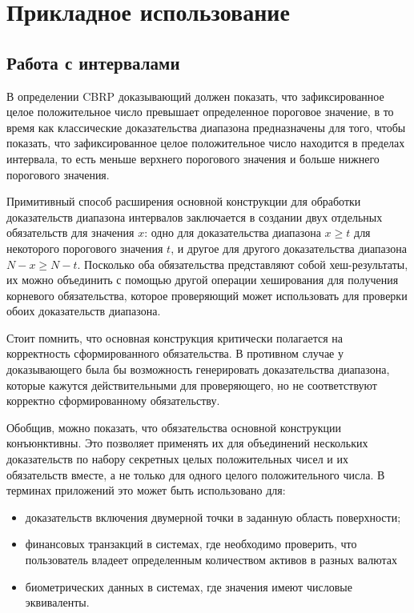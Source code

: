 \chapter{Прикладное использование}
\section{Работа с интервалами} %
В определении CBRP доказывающий должен показать, что зафиксированное целое положительное число превышает определенное пороговое значение, в то время как классические доказательства диапазона предназначены для того, чтобы показать, что зафиксированное целое положительное число находится в пределах интервала, то есть меньше верхнего порогового значения и больше нижнего порогового значения.

Примитивный способ расширения основной конструкции для обработки доказательств диапазона интервалов заключается в создании двух отдельных обязательств для значения $x$: одно для доказательства диапазона $x \geq t$ для некоторого порогового значения $t$, и другое для другого доказательства диапазона $N - x \geq N - t$. Посколько оба обязательства представляют собой хеш-результаты, их можно объединить с помощью другой операции хеширования для получения корневого обязательства, которое проверяющий может использовать для проверки обоих доказательств диапазона.

Стоит помнить, что основная конструкция критически полагается на корректность сформированного обязательства. В противном случае у доказывающего была бы возможность генерировать доказательства диапазона, которые кажутся действительными для проверяющего, но не соответствуют корректно сформированному обязательству.

Обобщив, можно показать, что обязательства основной конструкции конъюнктивны. Это позволяет применять их для объединений нескольких доказательств по набору секретных целых положительных чисел и их обязательств вместе, а не только для одного целого положительного числа. В терминах приложений это может быть использовано для:
\begin{itemize}
	\item доказательств включения двумерной точки в заданную область поверхности;
	\item финансовых транзакций в системах, где необходимо проверить, что пользователь владеет определенным количеством активов в разных валютах
	\item биометрических данных в системах, где значения имеют числовые эквиваленты.
\end{itemize}

